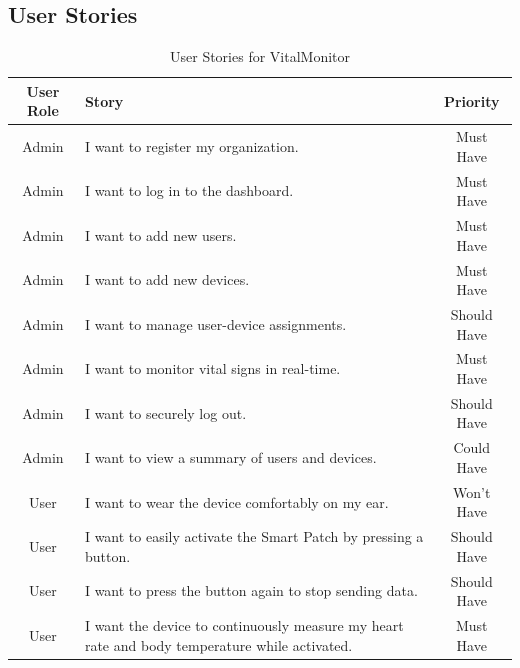 \subsection{User Stories}
\begin{table}[h]
    \centering
    \begin{tabularx}{\textwidth}{|c|X|c|}
        \hline
        \textbf{User Role} & \textbf{Story} & \textbf{Priority} \\ 
        \hline

        Admin & I want to register my organization. & Must Have \\ 
        \hline
        Admin & I want to log in to the dashboard. & Must Have \\
        \hline
        Admin & I want to add new users. & Must Have \\
        \hline
        Admin & I want to add new devices. & Must Have \\
        \hline
        Admin & I want to manage user-device assignments. & Should Have \\
        \hline
        Admin & I want to monitor vital signs in real-time. & Must Have \\
        \hline
        Admin & I want to securely log out. & Should Have \\
        \hline
        Admin & I want to view a summary of users and devices. & Could Have \\ 
        \hline
        User & I want to wear the device comfortably on my ear. & Won't Have \\
        \hline
        User & I want to easily activate the Smart Patch by pressing a button. & Should Have \\
        \hline
        User & I want to press the button again to stop sending data. & Should Have \\
        \hline
        User & I want the device to continuously measure my heart rate and body temperature while activated. & Must Have \\
        \hline

    \end{tabularx}
    \caption{User Stories for VitalMonitor}
    \label{tab:longtable}
\end{table}


\newpage
